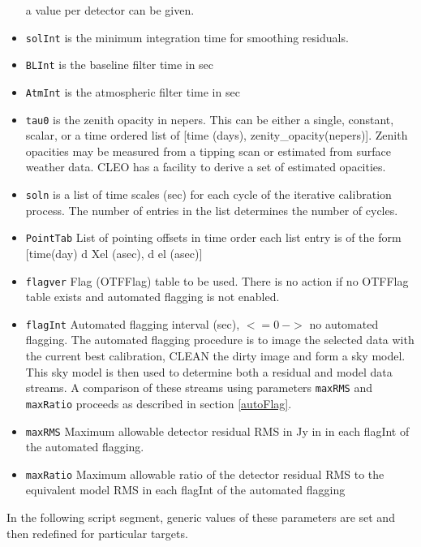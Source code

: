 \documentclass[11pt]{report}
\begin{document}
\begin{itemize}
a value per detector can be given.
\item {\tt solInt} is the minimum integration time for smoothing residuals.
\item {\tt BLInt} is the baseline filter time in sec
\item {\tt AtmInt} is the atmospheric filter time in sec
\item {\tt tau0} is the zenith opacity in nepers.
This can be either a single, constant,  scalar, or a time ordered
list of [time (days), zenity\_opacity(nepers)].
Zenith opacities may be measured from a tipping scan or estimated from
surface weather data.
CLEO has a facility to derive a set of estimated opacities.
\item {\tt soln} is a list of time scales (sec) for each cycle of
the iterative calibration process.
The number of entries in the list determines the number of cycles.
\item {\tt PointTab}  List of pointing offsets in time order
each list entry is of the form [time(day) d Xel (asec), d el (asec)] 
\item {\tt flagver} Flag (OTFFlag) table to be used.
There is no action if no OTFFlag table exists and automated flagging
is not enabled.
\item {\tt flagInt} Automated flagging interval (sec), $<=0\ ->$ no
automated flagging.
The automated flagging procedure is to image the selected data with
the current best calibration, CLEAN the dirty image and form a sky
model.
This sky model is then used to determine both a residual and model
data streams.
A comparison of these streams using parameters {\tt maxRMS} and 
{\tt maxRatio} proceeds as described in section \ref{autoFlag}.
\item {\tt maxRMS} Maximum allowable detector residual RMS in Jy in
in each flagInt of the automated flagging.
\item {\tt maxRatio} Maximum allowable ratio of the detector residual
RMS to the equivalent model RMS in each flagInt of the automated flagging
\end{itemize}
In the following script segment, generic values of these parameters
are set and then redefined for particular targets.
\end{document}
